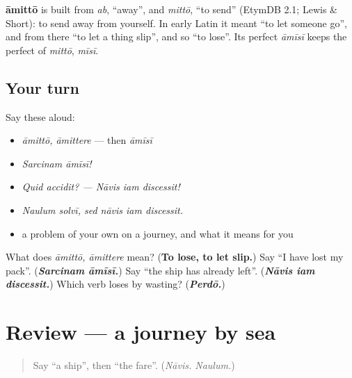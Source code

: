 \begin{cousinweb}
\textbf{āmittō} is built from \emph{ab}, \textquotedblleft{}away\textquotedblright{}, and \emph{mittō}, \textquotedblleft{}to send\textquotedblright{} (EtymDB 2.1; Lewis \& Short): to send away from yourself. In early Latin it meant \textquotedblleft{}to let someone go\textquotedblright{}, and from there \textquotedblleft{}to let a thing slip\textquotedblright{}, and so \textquotedblleft{}to lose\textquotedblright{}. Its perfect \emph{āmīsī} keeps the perfect of \emph{mittō}, \emph{mīsī}.
\end{cousinweb}

\subsection*{Your turn}
Say these aloud:

\begin{itemize}
\raggedright
  \item \emph{āmittō, āmittere} — then \emph{āmīsī}
  \item \emph{Sarcinam āmīsī!}
  \item \emph{Quid accidit? — Nāvis iam discessit!}
  \item \emph{Naulum solvī, sed nāvis iam discessit.}
  \item a problem of your own on a journey, and what it means for you
\end{itemize}

\begin{tcolorbox}[breakable,colback=teal!4,colframe=teal!35!black,title={Before you move on}]
What does \emph{āmittō, āmittere} mean? (\textbf{To lose, to let slip.}) Say \textquotedblleft{}I have lost my pack\textquotedblright{}. (\emph{\textbf{Sarcinam āmīsī.}}) Say \textquotedblleft{}the ship has already left\textquotedblright{}. (\emph{\textbf{Nāvis iam discessit.}}) Which verb loses by wasting? (\emph{\textbf{Perdō.}})
\end{tcolorbox}
\section[(review)]{Review — a journey by sea}

\label{lesson:LA-R286-by-sea}



\begin{quote}
Say \textquotedblleft{}a ship\textquotedblright{}, then \textquotedblleft{}the fare\textquotedblright{}. (\emph{Nāvis. Naulum.})
\end{quote}

